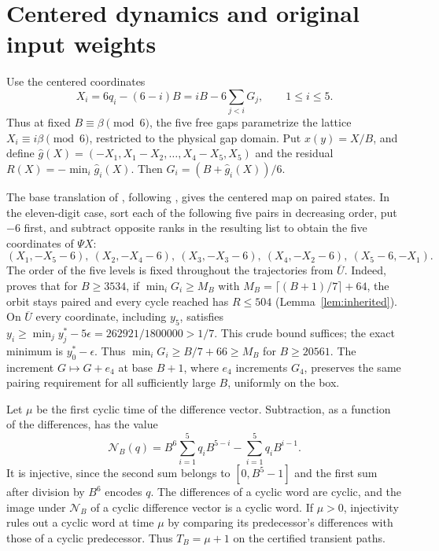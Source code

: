 \documentclass[11pt,reqno]{amsart}
\theoremstyle{remark}
\begin{document}
\section{Centered dynamics and original input weights}\label{sec:coordinates}

Use the centered coordinates
\begin{equation}\label{eq:center}
 X_i=6q_i-(6-i)B=iB-6\sum_{j<i}G_j,\qquad 1\le i\le5.
\end{equation}
Thus at fixed \(B\equiv\beta\pmod6\), the five free gaps parametrize the lattice \(X_i\equiv i\beta\pmod6\), restricted to the physical gap domain. Put \(x(y)=X/B\), and define \(\widehat g(X)=(-X_1,X_1-X_2,\ldots,X_4-X_5,X_5)\) and the residual \(R(X)=-\min_i\widehat g_i(X)\). Then \(G_i=(B+\widehat g_i(X))/6\).

The base translation of \cite[Theorem~4]{G4}, following \cite[Remark~4.3]{Thakur}, gives the centered map on paired states. In the eleven-digit case, sort each of the following five pairs in decreasing order, put \(-6\) first, and subtract opposite ranks in the resulting list to obtain the five coordinates of \(\Psi X\):
\begin{equation}\label{eq:pairs}
 (X_1,-X_5-6),\ (X_2,-X_4-6),\ (X_3,-X_3-6),\ (X_4,-X_2-6),\ (X_5-6,-X_1).
\end{equation}
The order of the five levels is fixed throughout the trajectories from \(\overline U\). Indeed, \cite[\S6]{G6} proves that for \(B\ge3534\), if \(\min_i G_i\ge M_B\) with \(M_B=\lceil(B+1)/7\rceil+64\), the orbit stays paired and every cycle reached has \(R\le504\) (Lemma~\ref{lem:inherited}). On \(\overline U\) every coordinate, including \(y_5\), satisfies \(y_i\ge\min_jy^*_j-5\epsilon=262921/1800000>1/7\). This crude bound suffices; the exact minimum is \(y^*_0-\epsilon\). Thus \(\min_i G_i\ge B/7+66\ge M_B\) for \(B\ge20561\). The increment \(G\mapsto G+e_4\) at base \(B+1\), where \(e_4\) increments \(G_4\), preserves the same pairing requirement for all sufficiently large \(B\), uniformly on the box.

Let \(\mu\) be the first cyclic time of the difference vector. Subtraction, as a function of the differences, has the value
\[
 \mathcal N_B(q)=B^6\sum_{i=1}^5 q_i B^{5-i}-\sum_{i=1}^5 q_i B^{i-1}.
\]
It is injective, since the second sum belongs to \([0,B^5-1]\) and the first sum after division by \(B^6\) encodes \(q\). The differences of a cyclic word are cyclic, and the image under \(\mathcal N_B\) of a cyclic difference vector is a cyclic word. If \(\mu>0\), injectivity rules out a cyclic word at time \(\mu\) by comparing its predecessor's differences with those of a cyclic predecessor. Thus \(T_B=\mu+1\) on the certified transient paths.
\end{document}
